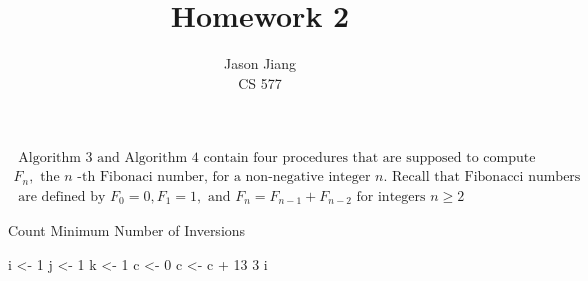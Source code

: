 \documentclass[12pt]{article}
\newenvironment{question}[2][Question]{\begin{trivlist}
\item[\hskip \labelsep {\bfseries #1}\hskip \labelsep {\bfseries #2.}]}{\end{trivlist}}
\begin{document}
 

\title{Homework 2}
\author{Jason Jiang\\ 
CS 577} 
 
\maketitle
 
\begin{question}{1}
$$    \begin{array} { l } { \text { Algorithm } 3 \text { and Algorithm } 4 \text { contain four procedures that are supposed to compute } } \\ { F _ { n } , \text { the } n \text { -th Fibonaci number, for a non-negative integer } n . \text { Recall that Fibonacci numbers } } \\ { \text { are defined by } F _ { 0 } = 0 , F _ { 1 } = 1 , \text { and } F _ { n } = F _ { n - 1 } + F _ { n - 2 } \text { for integers } n \geq 2 }
    \end{array}
$$

\end{question}
 



\begin{algorithm}
    \caption{Count Minimum Number of Inversions}\label{euclid}
    \begin{algorithmic}[1]
        \State i <- 1
        \State j <- 1
        \State k <- 1
        \State c <- 0
                    \State c <- c + 13 3
                \Endif
            \State i 
        
        \EndProcedure
    \end{algorithmic}
\end{algorithm}
\end{document}
